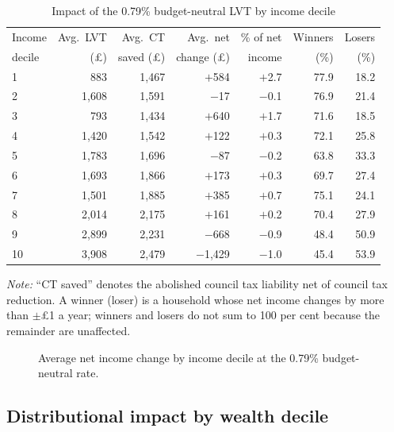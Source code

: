 \begin{table}[htbp]
\centering
\caption{Impact of the 0.79\% budget-neutral LVT by income decile}
\label{tab:income_impact}
\begin{tabular}{lrrrrrr}
\toprule
Income & Avg.\ LVT & Avg.\ CT & Avg.\ net & \% of net & Winners & Losers \\
decile & (\pounds) & saved (\pounds) & change (\pounds) & income & (\%) & (\%) \\
\midrule
1  & 883     & 1{,}467 & $+$584    & $+$2.7 & 77.9 & 18.2 \\
2  & 1{,}608 & 1{,}591 & $-$17     & $-$0.1 & 76.9 & 21.4 \\
3  & 793     & 1{,}434 & $+$640    & $+$1.7 & 71.6 & 18.5 \\
4  & 1{,}420 & 1{,}542 & $+$122    & $+$0.3 & 72.1 & 25.8 \\
5  & 1{,}783 & 1{,}696 & $-$87     & $-$0.2 & 63.8 & 33.3 \\
6  & 1{,}693 & 1{,}866 & $+$173    & $+$0.3 & 69.7 & 27.4 \\
7  & 1{,}501 & 1{,}885 & $+$385    & $+$0.7 & 75.1 & 24.1 \\
8  & 2{,}014 & 2{,}175 & $+$161    & $+$0.2 & 70.4 & 27.9 \\
9  & 2{,}899 & 2{,}231 & $-$668    & $-$0.9 & 48.4 & 50.9 \\
10 & 3{,}908 & 2{,}479 & $-$1{,}429 & $-$1.0 & 45.4 & 53.9 \\
\bottomrule
\end{tabular}

\medskip
{\footnotesize\emph{Note:} ``CT saved'' denotes the abolished council tax liability net of council tax reduction. A winner (loser) is a household whose net income changes by more than $\pm$\pounds 1 a year; winners and losers do not sum to 100 per cent because the remainder are unaffected.}
\end{table}

\begin{figure}[htbp]
\centering
{}
\caption{Average net income change by income decile at the 0.79\% budget-neutral rate.}
\label{fig:net_income}
\end{figure}

\subsection{Distributional impact by wealth decile}
\label{sec:wealth_impact}

